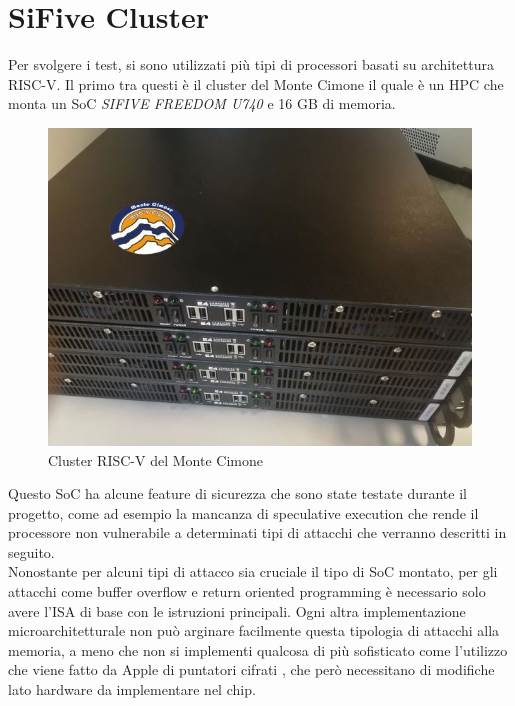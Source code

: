 \section*{SiFive Cluster}
Per svolgere i test, si sono utilizzati più tipi di processori basati su architettura RISC-V. Il primo tra questi è il cluster del Monte Cimone \cite{mcimone} il quale è un HPC che monta un SoC \textit{SIFIVE FREEDOM U740} e 16 GB di memoria.
\vspace{1cm}
\FloatBarrier
\begin{figure}[!htbp]
    \centering
    \includegraphics[width=1\linewidth]{images/cluster-monte-cimone-risc-v.jpg}
    \caption{Cluster RISC-V del Monte Cimone} 
\end{figure}
\FloatBarrier
\vspace{1cm}
Questo SoC ha alcune feature di sicurezza che sono state testate durante il progetto, come ad esempio la mancanza di speculative execution \cite{Techtarget} che rende il processore non vulnerabile a determinati tipi di attacchi che verranno descritti in seguito.\\
\newline
Nonostante per alcuni tipi di attacco sia cruciale il tipo di SoC montato, per gli attacchi come buffer overflow e return oriented programming è necessario solo avere l'ISA di base con le istruzioni principali. Ogni altra implementazione microarchitetturale non può arginare facilmente questa tipologia di attacchi alla memoria, a meno che non si implementi qualcosa di più sofisticato come l'utilizzo che viene fatto da Apple di puntatori cifrati \cite{AppleSec}, che però necessitano di modifiche lato hardware da implementare nel chip. 
